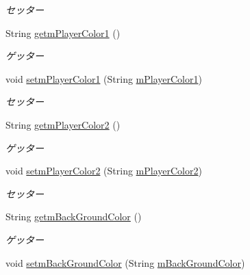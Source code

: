 \begin{DoxyCompactItemize}
\begin{DoxyCompactList}\small\item\em セッター \end{DoxyCompactList}\item 
String \hyperlink{classjp_1_1gr_1_1java__conf_1_1yuta__yoshinaga_1_1reversi_1_1model_1_1_reversi_setting_a72a40c1c07aae2f448d3cc9fba274a5a}{getm\+Player\+Color1} ()
\begin{DoxyCompactList}\small\item\em ゲッター \end{DoxyCompactList}\item 
void \hyperlink{classjp_1_1gr_1_1java__conf_1_1yuta__yoshinaga_1_1reversi_1_1model_1_1_reversi_setting_a349395ec1754a4a8b44c45d1513b075c}{setm\+Player\+Color1} (String \hyperlink{classjp_1_1gr_1_1java__conf_1_1yuta__yoshinaga_1_1reversi_1_1model_1_1_reversi_setting_a30b28df125b558ecec48220021d54173}{m\+Player\+Color1})
\begin{DoxyCompactList}\small\item\em セッター \end{DoxyCompactList}\item 
String \hyperlink{classjp_1_1gr_1_1java__conf_1_1yuta__yoshinaga_1_1reversi_1_1model_1_1_reversi_setting_a2e8aa2911593466237024cca77ef5ac5}{getm\+Player\+Color2} ()
\begin{DoxyCompactList}\small\item\em ゲッター \end{DoxyCompactList}\item 
void \hyperlink{classjp_1_1gr_1_1java__conf_1_1yuta__yoshinaga_1_1reversi_1_1model_1_1_reversi_setting_a7b432d7484ee6d55c594bfed3559f736}{setm\+Player\+Color2} (String \hyperlink{classjp_1_1gr_1_1java__conf_1_1yuta__yoshinaga_1_1reversi_1_1model_1_1_reversi_setting_a04a60c125e7258da4bba821a8d375dc6}{m\+Player\+Color2})
\begin{DoxyCompactList}\small\item\em セッター \end{DoxyCompactList}\item 
String \hyperlink{classjp_1_1gr_1_1java__conf_1_1yuta__yoshinaga_1_1reversi_1_1model_1_1_reversi_setting_a8b7d5e035f8d11b2acda13477cca5401}{getm\+Back\+Ground\+Color} ()
\begin{DoxyCompactList}\small\item\em ゲッター \end{DoxyCompactList}\item 
void \hyperlink{classjp_1_1gr_1_1java__conf_1_1yuta__yoshinaga_1_1reversi_1_1model_1_1_reversi_setting_a37c81bf1c76cb33e00fcfb81d37fd12d}{setm\+Back\+Ground\+Color} (String \hyperlink{classjp_1_1gr_1_1java__conf_1_1yuta__yoshinaga_1_1reversi_1_1model_1_1_reversi_setting_a5afb3de01401fef98521c6c5ac4a9398}{m\+Back\+Ground\+Color})

\end{DoxyCompactItemize}
